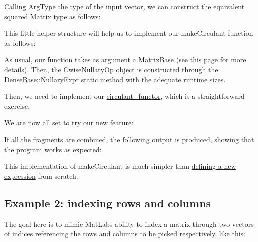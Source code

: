 Calling {\ttfamily Arg\+Type} the type of the input vector, we can construct the equivalent squared \hyperlink{group___core___module_class_eigen_1_1_matrix}{Matrix} type as follows\+:


\begin{DoxyCodeInclude}
\end{DoxyCodeInclude}
 This little helper structure will help us to implement our {\ttfamily make\+Circulant} function as follows\+:


\begin{DoxyCodeInclude}
\end{DoxyCodeInclude}
 As usual, our function takes as argument a {\ttfamily \hyperlink{group___core___module_class_eigen_1_1_matrix_base}{Matrix\+Base}} (see this \hyperlink{TopicFunctionTakingEigenTypes}{page} for more details). Then, the \hyperlink{group___core___module_class_eigen_1_1_cwise_nullary_op}{Cwise\+Nullary\+Op} object is constructed through the Dense\+Base\+::\+Nullary\+Expr static method with the adequate runtime sizes.

Then, we need to implement our {\ttfamily \hyperlink{classcirculant__functor}{circulant\+\_\+functor}}, which is a straightforward exercise\+:


\begin{DoxyCodeInclude}
\end{DoxyCodeInclude}
 We are now all set to try our new feature\+:


\begin{DoxyCodeInclude}
\end{DoxyCodeInclude}


If all the fragments are combined, the following output is produced, showing that the program works as expected\+:


\begin{DoxyCodeInclude}
\end{DoxyCodeInclude}


This implementation of {\ttfamily make\+Circulant} is much simpler than \hyperlink{TopicNewExpressionType}{defining a new expression} from scratch.\hypertarget{_topic_customizing__nullary_expr_NullaryExpr_Indexing}{}\subsection{Example 2\+: indexing rows and columns}\label{_topic_customizing__nullary_expr_NullaryExpr_Indexing}
The goal here is to mimic Mat\+Lab\textquotesingle{}s ability to index a matrix through two vectors of indices referencing the rows and columns to be picked respectively, like this\+:


